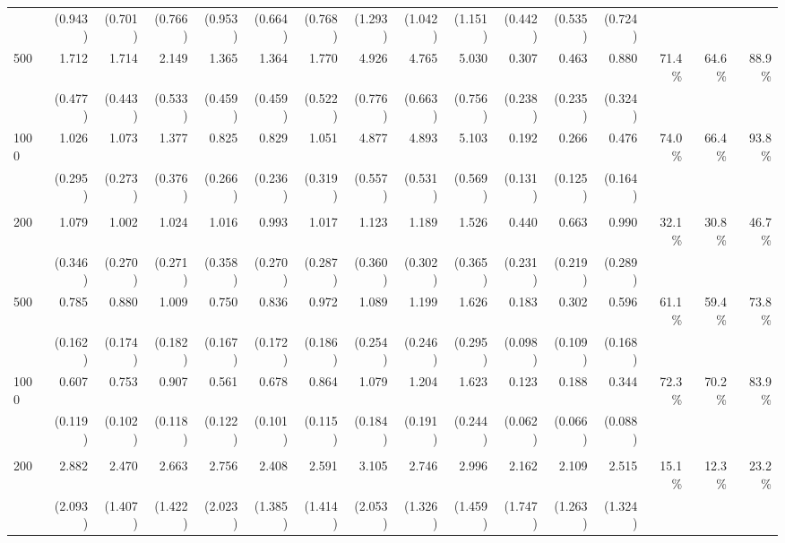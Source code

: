 \begin{table}[H]
{\begin{tabular}{lrrrrrrrrrrrrrrr}
       & (0.943)  & (0.701)  & (0.766)  & (0.953)  & (0.664)  & (0.768)  & (1.293)  & (1.042)  & (1.151)  & (0.442)  & (0.535)  & (0.724)  &   &   &  \\
500  & 1.712  & 1.714  & 2.149  & 1.365  & 1.364  & 1.770  & 4.926  & 4.765  & 5.030  & 0.307  & 0.463  & 0.880  & 71.4\%  & 64.6\%  & 88.9\% \\
       & (0.477)  & (0.443)  & (0.533)  & (0.459)  & (0.459)  & (0.522)  & (0.776)  & (0.663)  & (0.756)  & (0.238)  & (0.235)  & (0.324)  &   &   &  \\
1000  & 1.026  & 1.073  & 1.377  & 0.825  & 0.829  & 1.051  & 4.877  & 4.893  & 5.103  & 0.192  & 0.266  & 0.476  & 74.0\%  & 66.4\%  & 93.8\% \\
       & (0.295)  & (0.273)  & (0.376)  & (0.266)  & (0.236)  & (0.319)  & (0.557)  & (0.531)  & (0.569)  & (0.131)  & (0.125)  & (0.164)  &   &   &  \\
\addlinespace
\midrule
\multicolumn{16}{l}{Interaction} \\
\midrule
200  & 1.079  & 1.002  & 1.024  & 1.016  & 0.993  & 1.017  & 1.123  & 1.189  & 1.526  & 0.440  & 0.663  & 0.990  & 32.1\%  & 30.8\%  & 46.7\% \\
       & (0.346)  & (0.270)  & (0.271)  & (0.358)  & (0.270)  & (0.287)  & (0.360)  & (0.302)  & (0.365)  & (0.231)  & (0.219)  & (0.289)  &   &   &  \\
500  & 0.785  & 0.880  & 1.009  & 0.750  & 0.836  & 0.972  & 1.089  & 1.199  & 1.626  & 0.183  & 0.302  & 0.596  & 61.1\%  & 59.4\%  & 73.8\% \\
       & (0.162)  & (0.174)  & (0.182)  & (0.167)  & (0.172)  & (0.186)  & (0.254)  & (0.246)  & (0.295)  & (0.098)  & (0.109)  & (0.168)  &   &   &  \\
1000  & 0.607  & 0.753  & 0.907  & 0.561  & 0.678  & 0.864  & 1.079  & 1.204  & 1.623  & 0.123  & 0.188  & 0.344  & 72.3\%  & 70.2\%  & 83.9\% \\
       & (0.119)  & (0.102)  & (0.118)  & (0.122)  & (0.101)  & (0.115)  & (0.184)  & (0.191)  & (0.244)  & (0.062)  & (0.066)  & (0.088)  &   &   &  \\
\addlinespace
\midrule
\multicolumn{16}{l}{Non-linear interaction} \\
\midrule
200  & 2.882  & 2.470  & 2.663  & 2.756  & 2.408  & 2.591  & 3.105  & 2.746  & 2.996  & 2.162  & 2.109  & 2.515  & 15.1\%  & 12.3\%  & 23.2\% \\
       & (2.093)  & (1.407)  & (1.422)  & (2.023)  & (1.385)  & (1.414)  & (2.053)  & (1.326)  & (1.459)  & (1.747)  & (1.263)  & (1.324)  &   &   &  \\

\end{tabular}}
\end{table}
